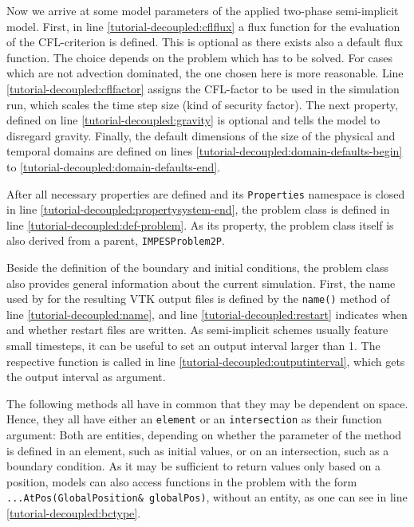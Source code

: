 Now we arrive at some model parameters of the applied two-phase semi-implicit 
model. First, in line  \ref{tutorial-decoupled:cflflux} a flux function for the evaluation of the CFL-criterion is defined. This is optional as there exists also a default flux function. The choice depends on the problem which has to be solved. For cases which are not advection dominated, the one chosen here is more reasonable.
Line \ref{tutorial-decoupled:cflfactor} assigns the CFL-factor to be used in the
simulation run, which scales the time step size (kind of security factor). The next property, defined on line \ref{tutorial-decoupled:gravity} 
is optional and tells the model to disregard gravity.
Finally, the default dimensions of the size of the physical and temporal
domains are defined on lines
\ref{tutorial-decoupled:domain-defaults-begin} to
\ref{tutorial-decoupled:domain-defaults-end}.

After all necessary properties are defined and 
its \texttt{Properties} namespace is closed in line \ref{tutorial-decoupled:propertysystem-end},
the problem class is defined in line \ref{tutorial-decoupled:def-problem}. 
As its property, the problem class itself is also derived from a parent, 
\texttt{IMPESProblem2P}.

Beside the definition of the boundary and initial conditions, the problem class also provides
general information about the current simulation. First, the name used by for the
resulting VTK output files is defined by the \texttt{name()} method of line
\ref{tutorial-decoupled:name}, and line \ref{tutorial-decoupled:restart} indicates
when and whether restart files are written. As semi-implicit schemes usually feature small 
timesteps, it can be useful to set an output interval larger than 1. The respective function is called in line \ref{tutorial-decoupled:outputinterval}, which gets the output interval as argument.

The following methods all have in common that they may be dependent on space.
Hence, they all have either an \texttt{element} or an \texttt{intersection} as their
function argument: Both are \Dune entities, depending on whether the parameter of the method is defined in an element, such as 
    initial values, or on an intersection, such as a boundary condition. As it may be sufficient to return values only based on a position, \eWoms models can also access functions in the problem with the form \mbox{\texttt{...AtPos(GlobalPosition\& globalPos)}}, without an \Dune entity, as one can see in line \ref{tutorial-decoupled:bctype}.

